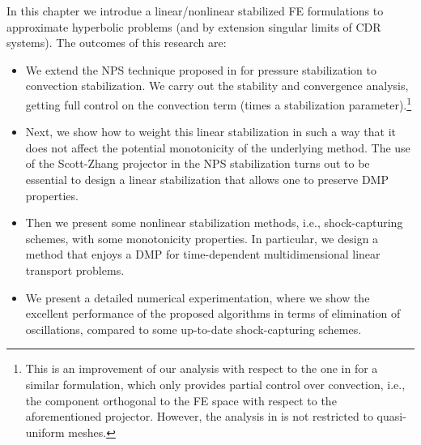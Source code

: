 In this chapter we introdue a linear/nonlinear stabilized FE formulations to approximate hyperbolic problems (and by extension singular limits of CDR systems). The outcomes of this research are:
\begin{itemize}
\item  We extend the NPS technique proposed in \cite{badia_stabilized_2012} for pressure stabilization to convection stabilization. We carry out the stability and convergence analysis, getting full control on the convection term (times a stabilization parameter).\footnote{This is an improvement of our analysis with respect to the one in \cite{rebollo_high_2013} for a similar formulation, which only provides partial control over convection, i.e., the component orthogonal to the FE space with respect to the aforementioned projector. However, the analysis in \cite{rebollo_high_2013} is not restricted to quasi-uniform meshes.}
\item Next, we show how to weight this linear stabilization in such a way that it  does not affect the potential  monotonicity of the underlying method. The use of the Scott-Zhang projector in the NPS stabilization turns out to be essential to design a linear stabilization that allows one to preserve DMP properties. 
\item Then we present some nonlinear stabilization methods, i.e., shock-capturing schemes, with some  monotonicity properties. In particular, we design a method that enjoys a DMP for time-dependent multidimensional linear transport problems. 
\item   We present a detailed numerical experimentation, where we show the excellent performance of the proposed algorithms in terms of elimination of oscillations, compared to some up-to-date shock-capturing schemes. 
\end{itemize}


